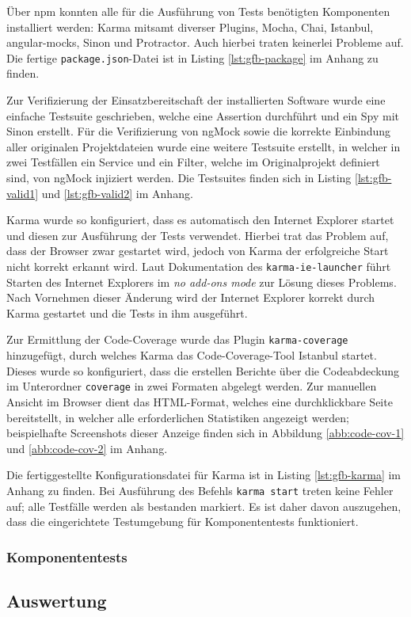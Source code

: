 Über npm konnten alle für die Ausführung von Tests benötigten Komponenten installiert werden: Karma mitsamt diverser Plugins, Mocha, Chai, Istanbul, angular-mocks, Sinon und Protractor. Auch hierbei traten keinerlei Probleme auf. Die fertige \texttt{package.json}-Datei ist in Listing \ref{lst:gfb-package} im Anhang zu finden.

Zur Verifizierung der Einsatzbereitschaft der installierten Software wurde eine einfache Testsuite geschrieben, welche eine Assertion durchführt und ein Spy mit Sinon erstellt. Für die Verifizierung von ngMock sowie die korrekte Einbindung aller originalen Projektdateien wurde eine weitere Testsuite erstellt, in welcher in zwei Testfällen ein Service und ein Filter, welche im Originalprojekt definiert sind, von ngMock injiziert werden. Die Testsuites finden sich in Listing \ref{lst:gfb-valid1} und \ref{lst:gfb-valid2} im Anhang. 

Karma wurde so konfiguriert, dass es automatisch den Internet Explorer startet und diesen zur Ausführung der Tests verwendet. Hierbei trat das Problem auf, dass der Browser zwar gestartet wird, jedoch von Karma der erfolgreiche Start nicht korrekt erkannt wird. Laut Dokumentation des \texttt{karma-ie-launcher} führt Starten des Internet Explorers im \textit{no add-ons mode} zur Lösung dieses Problems\cite{karma-ie-launcher}. Nach Vornehmen dieser Änderung wird der Internet Explorer korrekt durch Karma gestartet und die Tests in ihm ausgeführt.

Zur Ermittlung der Code-Coverage wurde das Plugin \texttt{karma-coverage} hinzugefügt, durch welches Karma das Code-Coverage-Tool Istanbul startet. Dieses wurde so konfiguriert, dass die erstellen Berichte über die Codeabdeckung im Unterordner \texttt{coverage} in zwei Formaten abgelegt werden. Zur manuellen Ansicht im Browser dient das HTML-Format, welches eine durchklickbare Seite bereitstellt, in welcher alle erforderlichen Statistiken angezeigt werden; beispielhafte Screenshots dieser Anzeige finden sich in Abbildung \ref{abb:code-cov-1} und \ref{abb:code-cov-2} im Anhang. 

Die fertiggestellte Konfigurationsdatei für Karma ist in Listing \ref{lst:gfb-karma} im Anhang zu finden. Bei Ausführung des Befehls \texttt{karma start} treten keine Fehler auf; alle Testfälle werden als bestanden markiert. Es ist daher davon auszugehen, dass die eingerichtete Testumgebung für Komponententests funktioniert. 	

\subsubsection{Komponententests}
\subsection{Auswertung}